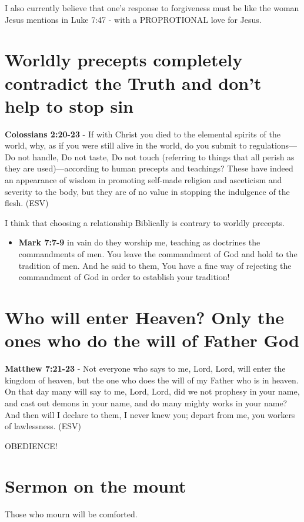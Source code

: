 \documentclass[11pt]{article}
\begin{document}
I also currently believe that one's response to forgiveness must be like the woman Jesus mentions in Luke 7:47 - with a PROPROTIONAL love for Jesus.

\section{Worldly precepts completely contradict the Truth and don't help to stop sin}
\label{sec:orga3b9c9d}
\textbf{Colossians 2:20-23} - If with Christ you died to the elemental spirits of the world, why, as if you were still alive in the world, do you submit to regulations— Do not handle, Do not taste, Do not touch (referring to things that all perish as they are used)—according to human precepts and teachings? These have indeed an appearance of wisdom in promoting self-made religion and asceticism and severity to the body, but they are of no value in stopping the indulgence of the flesh. (ESV)

I think that choosing a relationship Biblically is contrary to worldly precepts.

\begin{itemize}
\item \textbf{Mark 7:7-9} in vain do they worship me, teaching as doctrines the commandments of men.  You leave the commandment of God and hold to the tradition of men.  And he said to them, You have a fine way of rejecting the commandment of God in order to establish your tradition!
\end{itemize}

\section{Who will enter Heaven? Only the ones who do the will of Father God}
\label{sec:org2f9060d}
\textbf{Matthew 7:21-23} - Not everyone who says to me, Lord, Lord, will enter the kingdom of heaven, but the one who does the will of my Father who is in heaven. On that day many will say to me, Lord, Lord, did we not prophesy in your name, and cast out demons in your name, and do many mighty works in your name? And then will I declare to them, I never knew you; depart from me, you workers of lawlessness. (ESV)

OBEDIENCE!

\section{Sermon on the mount}
\label{sec:orgece56a9}
Those who mourn will be comforted.
\end{document}

